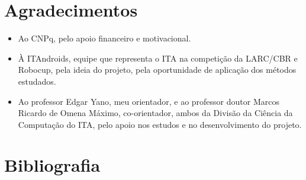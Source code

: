 \documentclass[a4paper,12pt]{article}
\begin{document}
\section{Agradecimentos}

\begin{itemize}
\item Ao CNPq, pelo apoio financeiro e motivacional.
\item À ITAndroids, equipe que representa o ITA na competição da LARC/CBR e Robocup, pela ideia do projeto, pela oportunidade de aplicação dos métodos estudados.
\item Ao professor Edgar Yano, meu orientador, e ao professor doutor Marcos Ricardo de Omena Máximo, co-orientador, ambos da Divisão da Ciência da Computação do ITA, pelo apoio nos estudos e no desenvolvimento do projeto.

\end{itemize}

\section{Bibliografia}

\printbibliography
\end{document}
